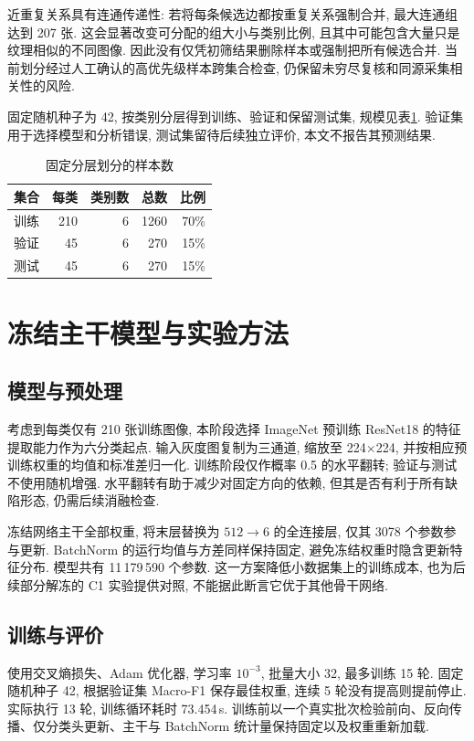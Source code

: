 \documentclass[letterpaper, 10 pt, conference]{ieeeconf}
\begin{document}
近重复关系具有连通传递性: 若将每条候选边都按重复关系强制合并, 最大连通组达到 207 张. 这会显著改变可分配的组大小与类别比例, 且其中可能包含大量只是纹理相似的不同图像. 因此没有仅凭初筛结果删除样本或强制把所有候选合并. 当前划分经过人工确认的高优先级样本跨集合检查, 仍保留未穷尽复核和同源采集相关性的风险.

固定随机种子为 42, 按类别分层得到训练、验证和保留测试集, 规模见表\ref{tab:split}. 验证集用于选择模型和分析错误, 测试集留待后续独立评价, 本文不报告其预测结果.

\begin{table}[t]
\centering
\caption{固定分层划分的样本数}
\label{tab:split}
\begin{tabular}{lrrrr}
\toprule
集合 & 每类 & 类别数 & 总数 & 比例 \\
\midrule
训练 & 210 & 6 & 1260 & 70\% \\
验证 & 45 & 6 & 270 & 15\% \\
测试 & 45 & 6 & 270 & 15\% \\
\bottomrule
\end{tabular}
\end{table}

\section{冻结主干模型与实验方法}
\subsection{模型与预处理}
考虑到每类仅有 210 张训练图像, 本阶段选择 ImageNet 预训练 ResNet18 的特征提取能力作为六分类起点\cite{resnet,pytorch-transfer}. 输入灰度图复制为三通道, 缩放至 224$\times$224, 并按相应预训练权重的均值和标准差归一化. 训练阶段仅作概率 0.5 的水平翻转; 验证与测试不使用随机增强. 水平翻转有助于减少对固定方向的依赖, 但其是否有利于所有缺陷形态, 仍需后续消融检查.

冻结网络主干全部权重, 将末层替换为 $512\rightarrow6$ 的全连接层, 仅其 3078 个参数参与更新. BatchNorm 的运行均值与方差同样保持固定, 避免冻结权重时隐含更新特征分布. 模型共有 11\,179\,590 个参数. 这一方案降低小数据集上的训练成本, 也为后续部分解冻的 C1 实验提供对照, 不能据此断言它优于其他骨干网络.

\subsection{训练与评价}
使用交叉熵损失、Adam 优化器, 学习率 $10^{-3}$, 批量大小 32, 最多训练 15 轮. 固定随机种子 42, 根据验证集 Macro-F1 保存最佳权重, 连续 5 轮没有提高则提前停止. 实际执行 13 轮, 训练循环耗时 73.454\,s. 训练前以一个真实批次检验前向、反向传播、仅分类头更新、主干与 BatchNorm 统计量保持固定以及权重重新加载.
\end{document}
